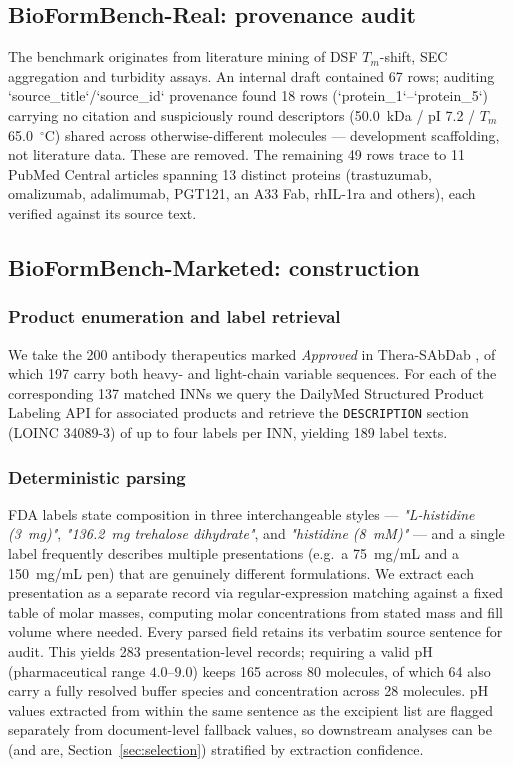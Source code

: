 \documentclass[twocolumn,10pt]{article}
\begin{document}
\subsection{BioFormBench-Real: provenance audit}
\label{sec:bfb-real}

The benchmark originates from literature mining of DSF $T_m$-shift, SEC
aggregation and turbidity assays. An internal draft contained 67 rows; auditing
`source\_title`/`source\_id` provenance found 18 rows (`protein\_1`--`protein\_5`)
carrying no citation and suspiciously round descriptors (50.0~kDa / pI 7.2 / $T_m$
65.0~$^\circ$C) shared across otherwise-different molecules --- development
scaffolding, not literature data. These are removed. The remaining 49 rows trace
to 11 PubMed Central articles spanning 13 distinct proteins (trastuzumab,
omalizumab, adalimumab, PGT121, an A33 Fab, rhIL-1ra and others), each verified
against its source text.

\subsection{BioFormBench-Marketed: construction}
\label{sec:bfb-marketed}

\subsubsection{Product enumeration and label retrieval}
We take the 200 antibody therapeutics marked \emph{Approved} in Thera-SAbDab
\cite{therasabdab2020}, of which 197 carry both heavy- and light-chain variable
sequences. For each of the corresponding 137 matched INNs we query the DailyMed
Structured Product Labeling API for associated products and retrieve the
\texttt{DESCRIPTION} section (LOINC 34089-3) of up to four labels per INN,
yielding 189 label texts.

\subsubsection{Deterministic parsing}
FDA labels state composition in three interchangeable styles --- \emph{"L-histidine
(3~mg)"}, \emph{"136.2~mg trehalose dihydrate"}, and \emph{"histidine (8~mM)"} ---
and a single label frequently describes multiple presentations (e.g.\ a 75~mg/mL
and a 150~mg/mL pen) that are genuinely different formulations. We extract each
presentation as a separate record via regular-expression matching against a fixed
table of molar masses, computing molar concentrations from stated mass and fill
volume where needed. Every parsed field retains its verbatim source sentence for
audit. This yields 283 presentation-level records; requiring a valid pH
(pharmaceutical range $4.0$--$9.0$) keeps 165 across 80 molecules, of which 64
also carry a fully resolved buffer species and concentration across 28 molecules.
pH values extracted from within the same sentence as the excipient list are
flagged separately from document-level fallback values, so downstream analyses can
be (and are, Section~\ref{sec:selection}) stratified by extraction confidence.
\end{document}
